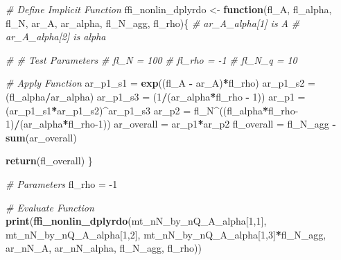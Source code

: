 \documentclass[
]{book}
\newenvironment{Shaded}{\begin{snugshade}}{\end{snugshade}}
\newcommand{\CommentTok}[1]{\textcolor[rgb]{0.56,0.35,0.01}{\textit{#1}}}
\newcommand{\ControlFlowTok}[1]{\textcolor[rgb]{0.13,0.29,0.53}{\textbf{#1}}}
\newcommand{\DecValTok}[1]{\textcolor[rgb]{0.00,0.00,0.81}{#1}}
\newcommand{\KeywordTok}[1]{\textcolor[rgb]{0.13,0.29,0.53}{\textbf{#1}}}
\newcommand{\NormalTok}[1]{#1}
\newcommand{\OperatorTok}[1]{\textcolor[rgb]{0.81,0.36,0.00}{\textbf{#1}}}
\newcommand{\StringTok}[1]{\textcolor[rgb]{0.31,0.60,0.02}{#1}}
\begin{document}
\begin{Shaded}
\begin{Highlighting}[]
\CommentTok{\# Define Implicit Function}
\NormalTok{ffi\_nonlin\_dplyrdo \textless{}{-}}\StringTok{ }\ControlFlowTok{function}\NormalTok{(fl\_A, fl\_alpha, fl\_N, ar\_A, ar\_alpha, fl\_N\_agg, fl\_rho)\{}
  \CommentTok{\# ar\_A\_alpha[1] is A}
  \CommentTok{\# ar\_A\_alpha[2] is alpha}

  \CommentTok{\# \# Test Parameters}
  \CommentTok{\# fl\_N = 100}
  \CommentTok{\# fl\_rho = {-}1}
  \CommentTok{\# fl\_N\_q = 10}

  \CommentTok{\# Apply Function}
\NormalTok{  ar\_p1\_s1 =}\StringTok{ }\KeywordTok{exp}\NormalTok{((fl\_A }\OperatorTok{{-}}\StringTok{ }\NormalTok{ar\_A)}\OperatorTok{*}\NormalTok{fl\_rho)}
\NormalTok{  ar\_p1\_s2 =}\StringTok{ }\NormalTok{(fl\_alpha}\OperatorTok{/}\NormalTok{ar\_alpha)}
\NormalTok{  ar\_p1\_s3 =}\StringTok{ }\NormalTok{(}\DecValTok{1}\OperatorTok{/}\NormalTok{(ar\_alpha}\OperatorTok{*}\NormalTok{fl\_rho }\OperatorTok{{-}}\StringTok{ }\DecValTok{1}\NormalTok{))}
\NormalTok{  ar\_p1 =}\StringTok{ }\NormalTok{(ar\_p1\_s1}\OperatorTok{*}\NormalTok{ar\_p1\_s2)}\OperatorTok{\^{}}\NormalTok{ar\_p1\_s3}
\NormalTok{  ar\_p2 =}\StringTok{ }\NormalTok{fl\_N}\OperatorTok{\^{}}\NormalTok{((fl\_alpha}\OperatorTok{*}\NormalTok{fl\_rho}\DecValTok{{-}1}\NormalTok{)}\OperatorTok{/}\NormalTok{(ar\_alpha}\OperatorTok{*}\NormalTok{fl\_rho}\DecValTok{{-}1}\NormalTok{))}
\NormalTok{  ar\_overall =}\StringTok{ }\NormalTok{ar\_p1}\OperatorTok{*}\NormalTok{ar\_p2}
\NormalTok{  fl\_overall =}\StringTok{ }\NormalTok{fl\_N\_agg }\OperatorTok{{-}}\StringTok{ }\KeywordTok{sum}\NormalTok{(ar\_overall)}

  \KeywordTok{return}\NormalTok{(fl\_overall)}
\NormalTok{\}}

\CommentTok{\# Parameters}
\NormalTok{fl\_rho =}\StringTok{ }\DecValTok{{-}1}

\CommentTok{\# Evaluate Function}
\KeywordTok{print}\NormalTok{(}\KeywordTok{ffi\_nonlin\_dplyrdo}\NormalTok{(mt\_nN\_by\_nQ\_A\_alpha[}\DecValTok{1}\NormalTok{,}\DecValTok{1}\NormalTok{],}
\NormalTok{                         mt\_nN\_by\_nQ\_A\_alpha[}\DecValTok{1}\NormalTok{,}\DecValTok{2}\NormalTok{],}
\NormalTok{                         mt\_nN\_by\_nQ\_A\_alpha[}\DecValTok{1}\NormalTok{,}\DecValTok{3}\NormalTok{]}\OperatorTok{*}\NormalTok{fl\_N\_agg,}
\NormalTok{                         ar\_nN\_A, ar\_nN\_alpha, fl\_N\_agg, fl\_rho))}
\end{Highlighting}
\end{Shaded}
\end{document}
